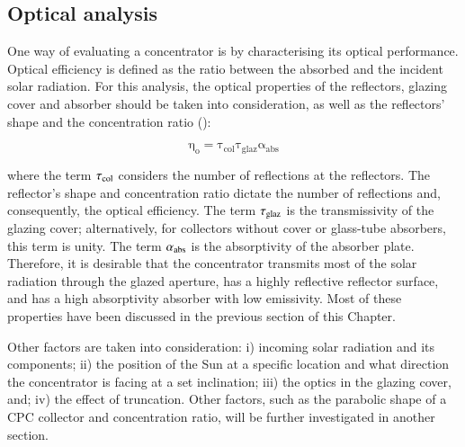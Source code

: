 \subsection{Optical analysis}

One way of evaluating a concentrator is by characterising its optical performance. Optical efficiency is defined as the ratio between the absorbed and the incident solar radiation. For this analysis, the optical properties of the reflectors, glazing cover and absorber should be taken into consideration, as well as the reflectors' shape and the concentration ratio (\cite{Sellami2013}):

\begin{equation}
	\mathrm{\eta_o = {\tau_{col}}\tau_{glaz}\alpha_{abs}}
	\label{optical0}
\end{equation}

\noindent where the term $\rm{\tau_{col}}$ considers the number of reflections at the reflectors. The reflector's shape and concentration ratio dictate the number of reflections and, consequently, the optical efficiency. The term $\rm{\tau_{glaz}}$ is the transmissivity of the glazing cover; alternatively, for collectors without cover or glass-tube absorbers, this term is unity. The term $\rm{\alpha_{abs}}$ is the absorptivity of the absorber plate. Therefore, it is desirable that the concentrator transmits most of the solar radiation through the glazed aperture, has a highly reflective reflector surface, and has a high absorptivity absorber with low emissivity. Most of these properties have been discussed in the previous section of this Chapter.

Other factors are taken into consideration: i) incoming solar radiation and its components; ii) the position of the Sun at a specific location and what direction the concentrator is facing at a set inclination; iii) the optics in the glazing cover, and; iv) the effect of truncation. Other factors, such as the parabolic shape of a CPC collector and concentration ratio, will be further investigated in another section.



